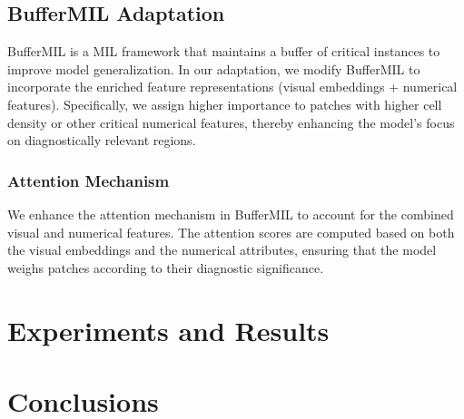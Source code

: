 \documentclass[10pt,twocolumn]{article}
\begin{document}
\subsection{BufferMIL Adaptation}

BufferMIL \cite{10.1007/978-3-031-43153-1_1} is a MIL framework that maintains a buffer of critical instances to improve model generalization. In our adaptation, we modify BufferMIL to incorporate the enriched feature representations (visual embeddings + numerical features). Specifically, we assign higher importance to patches with higher cell density or other critical numerical features, thereby enhancing the model's focus on diagnostically relevant regions.

\subsubsection{Attention Mechanism}

We enhance the attention mechanism in BufferMIL to account for the combined visual and numerical features. The attention scores are computed based on both the visual embeddings and the numerical attributes, ensuring that the model weighs patches according to their diagnostic significance.

\section{Experiments and Results} \label{results}

\section{Conclusions} \label{conclusions}



\end{document}
